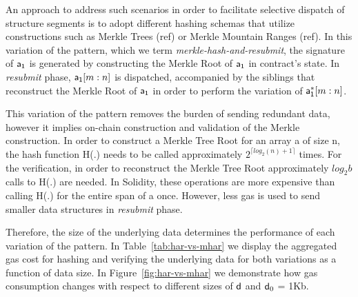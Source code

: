 An approach to address such scenarios in order to facilitate selective dispatch
of structure segments is to adopt different hashing schemas that utilize
constructions such as Merkle Trees (ref) or Merkle Mountain Ranges (ref). In
this variation of the pattern, which we term \emph{merkle-hash-and-resubmit},
the signature of $\mathsf{a_1}$ is generated by constructing the Merkle Root of
$\mathsf{a_1}$ in contract's state. In \emph{resubmit} phase, $\mathsf{a_1}[m:n]$ is
dispatched, accompanied by the siblings that reconstruct the Merkle Root of
$\mathsf{a_1}$ in order to perform the variation of $\mathsf{a_1^*}[m:n]$.

This variation of the pattern removes the burden of sending redundant data,
however it implies on-chain construction and validation of the Merkle
construction. In order to construct a Merkle Tree Root for an array \textsf{a}
of size \textsf{n}, the hash function \textsf{H}(.) needs to be called
approximately $2^{\lceil log_2(n) + 1 \rceil}$ times. For the verification, in
order to reconstruct the Merkle Tree Root approximately $log_2{b}$ calls to
\textsf{H}(.) are needed. In Solidity, these operations are more expensive than
calling \textsf{H}($.$) for the entire span of \textsf{a} once. However, less
gas is used to send smaller data structures in \emph{resubmit} phase.

Therefore, the size of the underlying data determines the performance of each
variation of the pattern. In Table~\ref{tab:har-vs-mhar} we display the
aggregated gas cost for hashing and verifying the underlying data for both
variations as a function of data size.  In Figure~\ref{fig:har-vs-mhar} we
demonstrate how gas consumption changes with respect to different sizes of
$\mathsf{d}$ and $\mathsf{d}_0$ = 1Kb.



